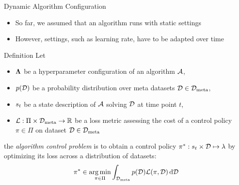 \begin{frame}[c]{Dynamic Algorithm Configuration}

\begin{itemize}
	\item So far, we assumed that an algorithm runs with static settings
	\item However, settings, such as learning rate, have to be adapted over time
\end{itemize}

\begin{block}{Definition}
	Let 
	\begin{itemize}
		\item $\mathbf{\Lambda}$ be a hyperparameter configuration of an algorithm $\mathcal{A}$,
		\pause
		\item $p(\mathcal{D})$ be a probability distribution over meta datasets $\mathcal{D} \in \mathcal{D}_{\text{meta}}$,
		\pause
		\item $s_t$ be a state description of $\mathcal{A}$ solving $\mathcal{D}$ at time point $t$,
		\pause
		\item $\mathcal{L}: \Pi \times \mathcal{D}_{\text{meta}} \to \mathbb{R}$ be a loss metric assessing the cost of a control policy $\pi \in \Pi$ on dataset $\mathcal{D} \in \mathcal{D}_{\text{meta}}$
	\end{itemize}
	
	\pause
	the \emph{algorithm control problem} is to obtain a control policy $\pi^* : s_t \times \mathcal{D} \mapsto \mathbf{\lambda}$ by optimizing its loss across a distribution of datasets:
	\begin{equation}
	\pi^* \in \operatorname*{arg\,min}_{\pi \in \Pi} \int_{\mathcal{D}_{\text{meta}}} p(\mathcal{D}) \mathcal{L}(\pi, \mathcal{D}) \mathop{}\!\mathrm{d} \mathcal{D} \nonumber
	\end{equation}
\end{block}

\end{frame}

